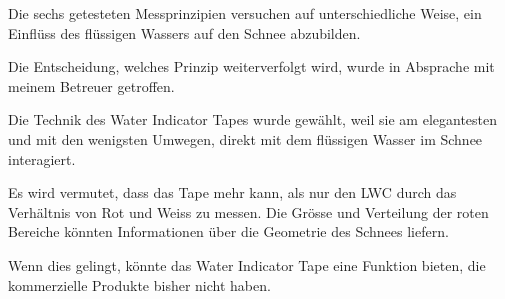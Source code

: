 Die sechs getesteten Messprinzipien versuchen auf unterschiedliche Weise, ein Einflüss des flüssigen Wassers auf den Schnee abzubilden.

Die Entscheidung, welches Prinzip weiterverfolgt wird, wurde in Absprache mit meinem Betreuer getroffen.

Die Technik des Water Indicator Tapes wurde gewählt, weil sie am elegantesten und mit den wenigsten Umwegen, direkt mit dem flüssigen Wasser im Schnee interagiert.


Es wird vermutet, dass das Tape mehr kann, als nur den LWC durch das Verhältnis von Rot und Weiss zu messen. Die Grösse und Verteilung der roten Bereiche könnten Informationen über die Geometrie des Schnees liefern.

Wenn dies gelingt, könnte das Water Indicator Tape eine Funktion bieten, die kommerzielle Produkte bisher nicht haben.
